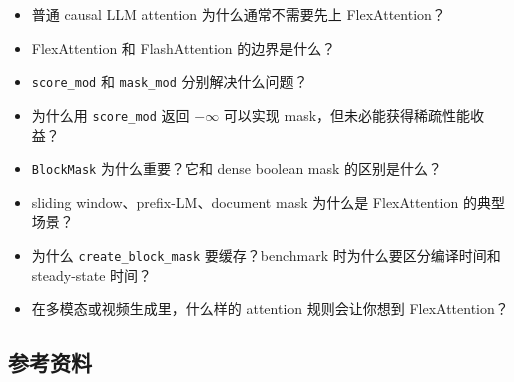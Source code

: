 \begin{itemize}[leftmargin=1.5em]
  \item 普通 causal LLM attention 为什么通常不需要先上 FlexAttention？
  \item FlexAttention 和 FlashAttention 的边界是什么？
  \item \texttt{score\_mod} 和 \texttt{mask\_mod} 分别解决什么问题？
  \item 为什么用 \texttt{score\_mod} 返回 $-\infty$ 可以实现 mask，但未必能获得稀疏性能收益？
  \item \texttt{BlockMask} 为什么重要？它和 dense boolean mask 的区别是什么？
  \item sliding window、prefix-LM、document mask 为什么是 FlexAttention 的典型场景？
  \item 为什么 \texttt{create\_block\_mask} 要缓存？benchmark 时为什么要区分编译时间和 steady-state 时间？
  \item 在多模态或视频生成里，什么样的 attention 规则会让你想到 FlexAttention？
\end{itemize}

\subsection{参考资料}

